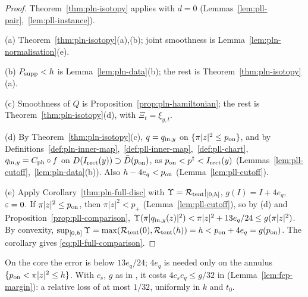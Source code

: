 \begin{proof}
Theorem~\ref{thm:pln-isotopy} applies with $d=0$ (Lemmas~\ref{lem:pll-pair},~\ref{lem:pll-instance}).

(a) Theorem~\ref{thm:pln-isotopy}(a),(b); joint smoothness is Lemma~\ref{lem:pln-normalisation}(e).

(b) $P_{\rm supp}<h$ is Lemma~\ref{lem:pln-data}(b); the rest is Theorem~\ref{thm:pln-isotopy}(a).

(c) Smoothness of $Q$ is Proposition~\ref{prop:pln-hamiltonian}; the rest is Theorem~\ref{thm:pln-isotopy}(d), with $\Xi_t=\xi_{y,t}$.

(d) By Theorem~\ref{thm:pln-isotopy}(c), $q=q_{{\rm in},y}$ on $\{\pi|z|^2\le p_{\rm on}\}$, and by Definitions~\ref{def:pln-inner-map},~\ref{def:pll-inner-map},~\ref{def:pll-chart}, $q_{{\rm in},y}=C_{\rm ph}\circ f$ on $D(I_{\rm rect}(y))\supset\bar D(p_{\rm on})$, as $p_{\rm on}<p^\dagger<I_{\rm rect}(y)$ (Lemmas~\ref{lem:pll-cutoff},~\ref{lem:pln-data}(b)). Also $h-4e_q<p_{\rm on}$ (Lemma~\ref{lem:pll-cutoff}).

(e) Apply Corollary~\ref{thm:pln-full-disc} with $\Upsilon=\mathcal{R}_{\rm tent}|_{[0,h]}$, $g(I)=I+4e_q$, $\varepsilon=0$. If $\pi|z|^2\le p_{\rm on}$, then $\pi|z|^2<p_+$ (Lemma~\ref{lem:pll-cutoff}), so by (d) and Proposition~\ref{prop:pll-comparison}, $\Upsilon(\pi|q_{{\rm in},y}(z)|^2)<\pi|z|^2+13e_q/24\le g(\pi|z|^2)$. By convexity, $\sup_{[0,h]}\Upsilon=\max(\mathcal{R}_{\rm tent}(0),\mathcal{R}_{\rm tent}(h))=h<p_{\rm on}+4e_q=g(p_{\rm on})$. The corollary gives \eqref{eq:pll-full-comparison}.
\end{proof}

On the core the error is below $13e_q/24$; $4e_q$ is needed only on the annulus $\{p_{\rm on}<\pi|z|^2\le h\}$. With $c_s$, $g$ as in , it costs $4c_se_q\le g/32$ in  (Lemma~\ref{lem:fcp-margin}): a relative loss of at most $1/32$, uniformly in $k$ and $t_0$.
